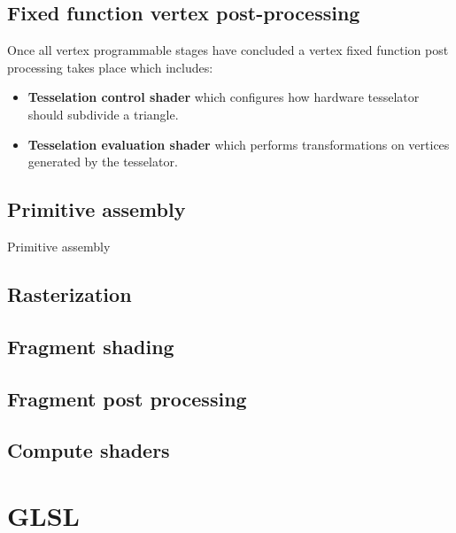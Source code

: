 \subsection{Fixed function vertex post-processing}

Once all vertex programmable stages have concluded a vertex fixed function post processing takes place which includes:

\begin{itemize}
    \item \textbf{Tesselation control shader} which configures how hardware tesselator should subdivide a triangle.
    \item \textbf{Tesselation evaluation shader} which performs transformations on vertices generated by the tesselator.
\end{itemize}

\subsection{Primitive assembly}

Primitive assembly

\subsection{Rasterization}

\subsection{Fragment shading}

\subsection{Fragment post processing}

\subsection{Compute shaders}

\section{GLSL}


